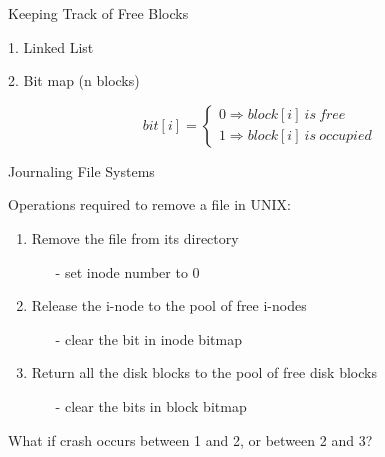 \begin{frame}{Keeping Track of Free Blocks}
  \begin{minipage}{.4\textwidth}
    \alert{1.} Linked List
    \begin{center}
    \end{center}
  \end{minipage}\hfill
  \begin{minipage}{.5\textwidth}
    \alert{2.} Bit map (n blocks)
    \begin{center}
    \end{center}
    \begin{equation*}
      bit[i]=
      \begin{cases}
        0\Rightarrow{}block[i]\ is\ free\\
        1\Rightarrow{}block[i]\ is\ occupied
      \end{cases}
    \end{equation*}
  \end{minipage}
\end{frame}

\begin{frame}{Journaling File Systems}
  \begin{block}{Operations required to remove a file in UNIX:}
    \begin{enumerate}
    \item Remove the file from its directory
      \begin{itemize}
      \item[-] set inode number to 0
      \end{itemize}
    \item Release the i-node to the pool of free i-nodes
      \begin{itemize}
      \item[-] clear the bit in inode bitmap
      \end{itemize}
    \item Return all the disk blocks to the pool of free disk blocks
      \begin{itemize}
      \item[-] clear the bits in block bitmap
      \end{itemize}
    \end{enumerate}
    What if crash occurs between 1 and 2, or between 2 and 3?
  \end{block}
\end{frame}


